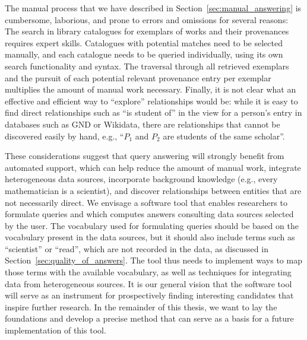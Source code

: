 The manual process that we have described in Section~\ref{sec:manual_answering}
is cumbersome, laborious, and prone to errors and omissions for several reasons:
The search in library catalogues for exemplars of works and their provenances requires expert skills.
Catalogues with potential matches need to be selected manually,
and each catalogue needs to be queried individually, using its own search functionality and syntax. 
The traversal through all retrieved exemplars and the pursuit of each potential relevant provenance entry per exemplar 
multiplies the amount of manual work necessary.
Finally, it is not clear what an effective and efficient way to \enquote{explore} relationships would be:
while it is easy to find direct relationships such as \enquote{is student of} in the view for a person's entry
in databases such as GND or Wikidata, there are relationships that cannot be discovered easily by hand,
e.g., \enquote{$P_1$ and $P_2$ are students of the same scholar}.

These considerations suggest that query answering will
strongly benefit from automated support,
which can help reduce the amount of manual work, integrate heterogeneous data sources,
incorporate background knowledge (e.g., every mathematician is a scientist),
and discover relationships between entities that are not necessarily direct.
We envisage a software tool that enables researchers to formulate queries 
and which computes answers consulting data sources selected by the user.
The vocabulary used for formulating queries should be based on the vocabulary
present in the data sources, but it should also include terms such as \enquote{scientist} or \enquote{read},
which are not recorded in the data, as discussed in
Section~\ref{sec:quality_of_answers}. The tool thus needs to implement ways
to map those terms with the available vocabulary, as well as techniques
for integrating data from heterogeneous sources.
It is our general vision that the software tool will serve as an instrument for prospectively finding interesting
candidates that inspire further research.
In the remainder of this thesis, we want to lay the foundations and develop a precise method
that can serve as a basis for a future implementation of this tool.

